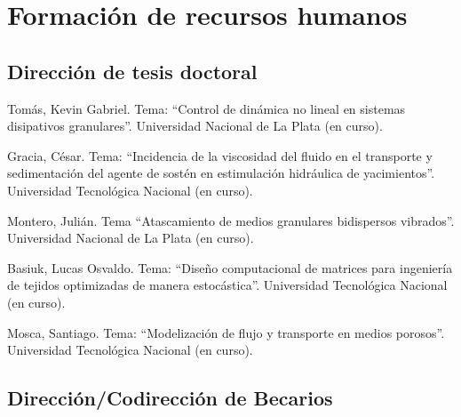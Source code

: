 \section{Formación de recursos humanos}

\subsection{Dirección de tesis doctoral}

\begin{timeline}
 Tomás, Kevin Gabriel. Tema: ``Control de dinámica no lineal en sistemas disipativos granulares''. Universidad Nacional de La Plata (en curso).

 Gracia, César. Tema: ``Incidencia de la viscosidad del fluido en el transporte y sedimentación del agente de sostén en estimulación hidráulica de yacimientos''. Universidad Tecnológica Nacional (en curso).

 Montero, Julián. Tema ``Atascamiento de medios granulares bidispersos vibrados''. Universidad Nacional de La Plata (en curso).

 Basiuk, Lucas Osvaldo. Tema: ``Diseño computacional de matrices para ingeniería de tejidos optimizadas de manera estocástica''. Universidad Tecnológica Nacional  (en curso).

 Mosca, Santiago. Tema: ``Modelización de flujo y transporte en medios porosos''. Universidad Tecnológica Nacional (en curso).
\end{timeline}

\subsection{Dirección/Codirección de Becarios}

